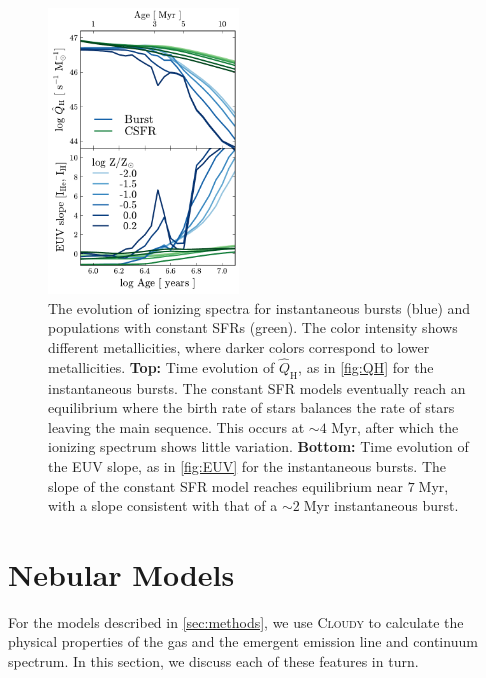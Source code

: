 \documentclass[linenumbers, tighten, trackchanges]{aastex61}%
\newcommand{\Fig}[1]{\autoref{fig:#1}}
\newcommand{\Sec}[1]{\autoref{sec:#1}}
\newcommand{\Cloudy}{\textsc{Cloudy}\xspace}
\newcommand{\QHat}{\ensuremath{\hat{Q}_{\mathrm{H}}}}
\begin{document}
\begin{figure}[!htbp]
  \begin{centering}
    \includegraphics[width=0.45\textwidth]{f4.pdf}
    \caption{The  evolution of ionizing spectra for instantaneous bursts (blue) and populations with constant SFRs (green). The color intensity shows different metallicities, where darker colors correspond to lower metallicities. \textbf{Top:} Time evolution of \QHat{}, as in \Fig{QH} for the instantaneous bursts. The constant SFR models eventually reach an equilibrium where the birth rate of stars balances the rate of stars leaving the main sequence. This occurs at ${\sim}4$ Myr, after which the ionizing spectrum shows little variation. \textbf{Bottom: } Time evolution of the EUV slope, as in \Fig{EUV} for the instantaneous bursts. The slope of the constant SFR model reaches equilibrium near $7\;$Myr, with a slope consistent with that of a ${\sim}2\;$Myr instantaneous burst.}
    \label{fig:CSFHQ}
  \end{centering}
\end{figure}

\section{Nebular Models}\label{sec:models}

For the models described in \Sec{methods}, we use \Cloudy to calculate the physical properties of the gas and the emergent emission line and continuum spectrum. In this section, we discuss each of these features in turn.
\end{document}
